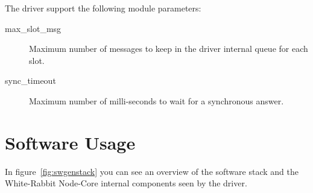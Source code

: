 \documentclass[a4paper,10pt]{article}
\begin{document}
The driver support the following module parameters:
\begin{description}
  \item[max\_slot\_msg] Maximum number of messages to keep in the
    driver internal queue for each slot.
  \item[sync\_timeout] Maximum number of milli-seconds to wait for a
    synchronous answer.
\end{description}


\section{Software Usage}%
In figure~\ref{fig:swgenstack} you can see an overview of the software
stack and the White-Rabbit Node-Core internal components seen by the
driver.
\end{document}
